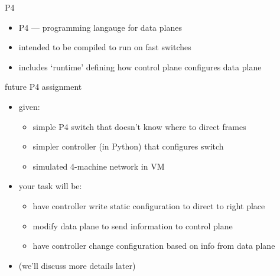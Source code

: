 
\begin{frame}{P4}
    \begin{itemize}
    \item P4 --- programming langauge for data planes
    \item intended to be compiled to run on fast switches
    \item includes `runtime' defining how control plane configures data plane
    \end{itemize}
\end{frame}

\begin{frame}{future P4 assignment}
    \begin{itemize}
    \item given: 
        \begin{itemize}
        \item simple P4 switch that doesn't know where to direct frames
        \item simpler controller (in Python) that configures switch
        \item simulated 4-machine network in VM
        \end{itemize}
    \item your task will be:
        \begin{itemize}
        \item have controller write static configuration to direct to right place
        \item modify data plane to send information to control plane
        \item have controller change configuration based on info from data plane
        \end{itemize}
    \item (we'll discuss more details later)
    \end{itemize}
\end{frame}

